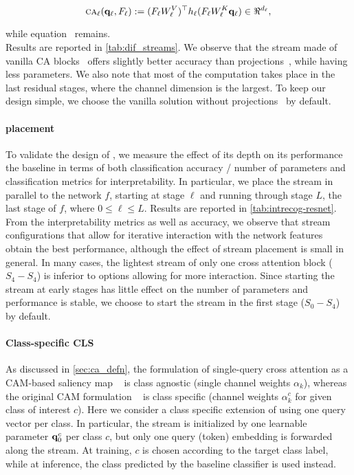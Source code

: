 \begin{equation}
	\ca_\ell(\vq_\ell, F_\ell) \defn (F_\ell W^V_\ell)\tran h_\ell(F_\ell W^K_\ell \vq_\ell)\in 
    \real^{d_\ell},
\label{eq:proj_ca}
\end{equation}

while equation~ remains.\\

\noindent Results are reported in \autoref{tab:dif_streams}. We observe that the stream made of 
vanilla CA blocks~ offers slightly better accuracy than projections~, while 
having less parameters. We also note that most of the computation takes place in the last residual 
stages, where the channel dimension is the largest. To keep our design simple, we choose the 
vanilla solution without projections~ by default.



\paragraph{\Ours placement}
\label{ab:placement}

To validate the design of \Ours, we measure the effect of its depth on its performance \vs the 
baseline \gap in terms of both classification accuracy / number of parameters and classification 
metrics for interpretability. In particular, we place the stream in parallel to the network $f$, 
starting at stage $\ell$ and running through stage $L$, the last stage of $f$, where $0 \le \ell 
\le L$. Results are reported in \autoref{tab:intrecog-resnet}.\\

\noindent From the interpretability metrics as well as accuracy, we observe that stream 
configurations that allow for iterative interaction with the network features obtain the best 
performance, although the effect of stream placement is small in general. In many cases, the 
lightest stream of only one cross attention block ($S_4-S_4$) is inferior to options allowing for 
more interaction. 
Since starting the stream at early stages has little effect on the number of parameters and 
performance is stable, we choose to start the stream in the first stage ($S_0-S_4$) by default.


\paragraph{Class-specific CLS}
As discussed in \autoref{sec:ca_defn}, the formulation of single-query cross attention as a 
CAM-based saliency map ~ is class agnostic (single channel weights $\alpha_k$), whereas the 
original CAM formulation ~ is class specific (channel weights $\alpha_k^c$ for given class 
of interest $c$). 
Here we consider a class specific extension of \Ours using one query vector per class. 
In particular, the stream is initialized by one learnable parameter $\mathbf{q}_0^c$ per class $c$, but 
only one query (\cls token) embedding is forwarded along the stream. At training, $c$ is chosen 
according to the target class label, while at inference, the class predicted by the baseline 
classifier is used instead.

